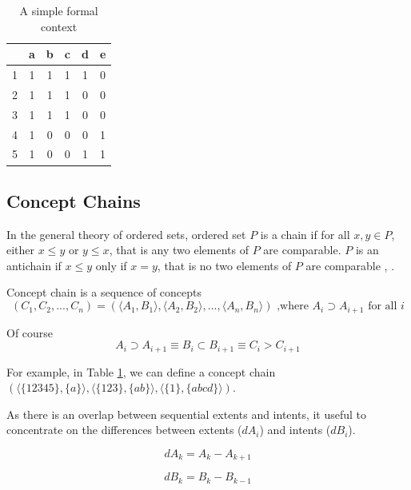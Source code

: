 \documentclass[acmconf,authordraft]{acmart}
\begin{document}
\begin{table}
  \caption{A simple  formal context}
  \label{tab:simplecontext}
  \begin{tabular}{lccccc}
    \toprule
    & a & b & c & d & e\\
    \midrule
    1 & 1 & 1 & 1 & 1 & 0\\
    2 & 1 & 1 & 1 & 0 & 0\\
    3 & 1 & 1 & 1 & 0 & 0\\
    4 & 1 & 0 & 0 & 0 & 1\\
    5 & 1 & 0 & 0 & 1 & 1\\
  \bottomrule
\end{tabular}
\end{table}

\subsection{Concept Chains}

In the general theory of ordered sets, ordered set $P$ is a chain if for all $x, y \in P$, either $x \leq y$ or $y \leq x$, that is any two elements of $P$ are comparable. $P$ is an antichain if $x \leq y$ only if $x=y$, that is no two elements of $P$ are comparable \cite{davey_introduction_2002}, \cite{ore_chains_1943}.

Concept chain is a sequence of concepts
\begin{equation}
  (C_1, C_2,..., C_n) = (\langle A_1, B_1 \rangle,\langle A_2,B_2 \rangle,  ..., \langle A_n,B_n \rangle)  \text{ ,where  }  A_i \supset  A_{i+1} \text{ for all } i
\end{equation}

Of course
\begin{displaymath}
A_i \supset A_{i+1} \equiv B_i \subset B_{i+1} \equiv C_i > C_{i+1}
\end{displaymath}

For example, in Table \ref{tab:simplecontext}, we can define a concept chain 
$(\langle \{12345\}, \{a\} \rangle,
 \langle \{123\}, \{ab\} \rangle,  
 \langle \{1\}, \{abcd\} \rangle)$.

As there is an overlap between sequential extents and intents, it useful to concentrate on the differences between extents ($dA_i$) and intents ($dB_i$).

\begin{equation}
dA_k = A_k - A_{k+1}
\end{equation}

\begin{equation}
dB_k = B_k - B_{k-1}
\end{equation}
\end{document}
